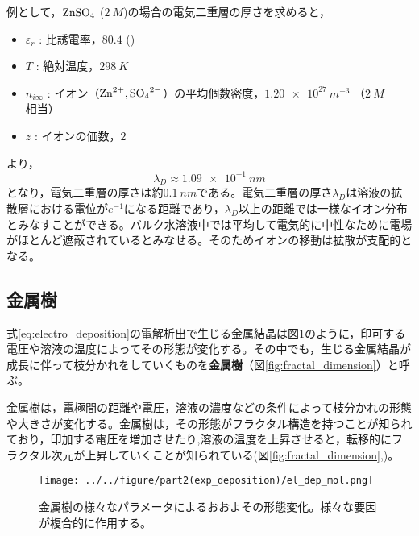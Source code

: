 \documentclass[autodetect-engine,dvi=dvipdfmx,a4paper,ja=standard,oneside,openany,11pt]{bxjsbook}
\begin{document}
例として，$\ce{ZnSO_4}$ ($\SI{2}{M}$)の場合の電気二重層の厚さを求めると，
\begin{itemize}
  \item $\varepsilon_r$ : 比誘電率，$80.4$ ()
  \item $T$ : 絶対温度，$\SI{298}{K}$
  \item $n_{i\infty}$ : イオン（$\ce{Zn^{2+},SO_4^{2-}}$）の平均個数密度，$\SI{1.20e27}{m^{-3}}$ （$\SI{2}{M}$相当）
  \item $z$ : イオンの価数，$2$
\end{itemize}
より，
\begin{equation}
  \lambda_D\approx \SI{1.09e-1}{nm}
\end{equation}
となり，電気二重層の厚さは約$\SI{0.1}{nm}$である。電気二重層の厚さ$\lambda_D$は溶液の拡散層における電位が$e^{-1}$になる距離であり，$\lambda_D$以上の距離では一様なイオン分布とみなすことができる。バルク水溶液中では平均して電気的に中性なために電場がほとんど遮蔽されているとみなせる。そのためイオンの移動は拡散が支配的となる。
\subsection{金属樹}
式\eqref{eq:electro_deposition}の電解析出で生じる金属結晶は図\ref{fig:el_dep_mol}のように，印可する電圧や溶液の温度によってその形態が変化する\cite{suda2003temperature}。その中でも，生じる金属結晶が成長に伴って枝分かれをしていくものを\textbf{金属樹}（図\ref{fig:fractal_dimension}）と呼ぶ。

金属樹は，電極間の距離や電圧，溶液の濃度などの条件によって枝分かれの形態や大きさが変化する。金属樹は，その形態がフラクタル構造を持つことが知られており，印加する電圧を増加させたり\cite{matsushita1984fractal},溶液の温度を上昇させると\cite{suda2003temperature}，転移的にフラクタル次元が上昇していくことが知られている(図\ref{fig:fractal_dimension},)。
\begin{figure}[htbp]
  \centering
  \texttt{[image: ../../figure/part2(exp\_deposition)/el\_dep\_mol.png]}
  \caption{金属樹の様々なパラメータによるおおよその形態変化。様々な要因が複合的に作用する\cite{suda2003temperature}。}
  \label{fig:el_dep_mol}
\end{figure}
\end{document}
